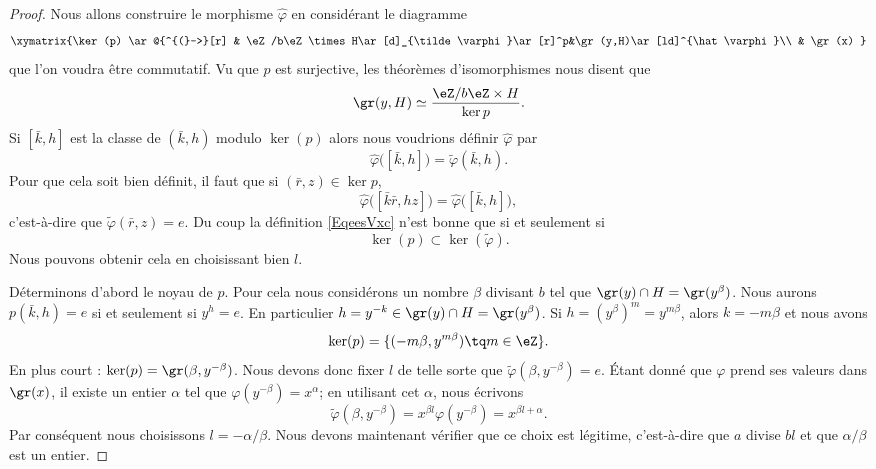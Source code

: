 \begin{proof}
    Nous allons construire le morphisme \( \hat \varphi\) en considérant le diagramme
    \begin{equation}
    \xymatrix{%
    \ker(p) \ar@{^{(}->}[r]        &   \eZ/b\eZ\times H\ar[d]_{\tilde \varphi}\ar[r]^p&\gr(y,H)\ar[ld]^{\hat \varphi}\\
          &   \gr(x)
       }
    \end{equation}
    que l'on voudra être commutatif. Vu que \( p\) est surjective, les théorèmes d'isomorphismes nous disent que
    \begin{equation}
        \gr(y,H)\simeq\frac{ \eZ/b\eZ\times H }{ \ker p }.
    \end{equation}
    Si \( [\bar k,h]\) est la classe de \( (\bar k,h)\) modulo \( \ker(p)\) alors nous voudrions définir \( \hat \varphi\) par
    \begin{equation}        \label{EqeesVxc}
        \hat\varphi\big( [\bar k,h] \big)=\tilde \varphi(\bar k,h).
    \end{equation}
    Pour que cela soit bien définit, il faut que si \( (\bar r,z)\in \ker p\),
    \begin{equation}
        \hat\varphi\big( [\bar k\bar r,hz] \big)=\hat\varphi\big( [\bar k,h] \big),
    \end{equation}
    c'est-à-dire que \( \tilde \varphi(\bar r,z)=e\). Du coup la définition \eqref{EqeesVxc} n'est bonne que si et seulement si
    \begin{equation}
        \ker(p)\subset\ker(\tilde\varphi ).
    \end{equation}
    Nous pouvons obtenir cela en choisissant bien \( l\).

    Déterminons d'abord le noyau de \( p\). Pour cela nous considérons un nombre \( \beta\) divisant \( b\) tel que \( \gr(y)\cap H=\gr(y^{\beta})\). Nous aurons \( p(\bar k,h)=e\) si et seulement si \( y^h=e\). En particulier \( h=y^{-k}\in\gr(y)\cap H=\gr(y^{\beta})\). Si \( h=(y^{\beta})^m=y^{m\beta}\), alors \( k=-m\beta\) et nous avons
    \begin{equation}
        \ker(p)=\{ (-m\beta,y^{m\beta})\tq m\in \eZ \}.
    \end{equation}
    En plus court : \( \ker(p)=\gr(\beta,y^{-\beta})\). Nous devons donc fixer \( l\) de telle sorte que \( \tilde \varphi(\beta,y^{-\beta})=e\). Étant donné que \( \varphi\) prend ses valeurs dans \( \gr(x)\), il existe un entier \( \alpha\) tel que \( \varphi(y^{-\beta})=x^{\alpha}\); en utilisant cet \( \alpha\), nous écrivons
    \begin{equation}
        \tilde \varphi(\beta,y^{-\beta})=x^{\beta l}\varphi(y^{-\beta})=x^{\beta l+\alpha}.
    \end{equation}
    Par conséquent nous choisissons \( l=-\alpha/\beta\). Nous devons maintenant vérifier que ce choix est légitime, c'est-à-dire que \( a\) divise \( bl\) et que \( \alpha/\beta\) est un entier.


\end{proof}
